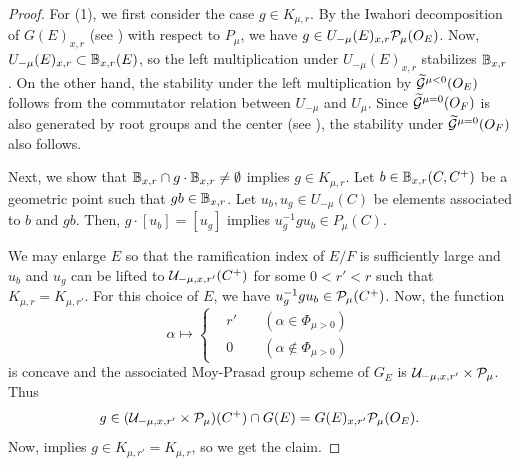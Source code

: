 \documentclass[12pt,reqno]{amsart}
\begin{document}
\begin{proof}
    For (1), we first consider the case $g \in K_{\mu, r}$. By the Iwahori decomposition of $G(E)_{x, r}$ (see \cite[Proposition 13.2.5 (3)]{KP23}) with respect to $P_\mu$, we have $g \in U_{-\mu}(E)_{x, r} {\mathcal{P}}_\mu(O_E)$. Now, $U_{-\mu}(E)_{x, r} \subset \mathbb{B}_{x, r}(E)$, so the left multiplication under $U_{-\mu}(E)_{x, r}$ stabilizes $\mathbb{B}_{x, r}$. On the other hand, the stability under the left multiplication by ${\widetilde{{\mathcal{G}}}}^{\mu < 0}(O_E)$ follows from the commutator relation between $U_{-\mu}$ and $U_{\mu}$. Since ${\widetilde{{\mathcal{G}}}}^{\mu=0}(O_F)$ is also generated by root groups and the center (see \cite[Definition 7.3.3]{KP23}), the stability under ${\widetilde{{\mathcal{G}}}}^{\mu=0}(O_F)$ also follows. 
    
    Next, we show that $\mathbb{B}_{x, r} \cap g \cdot \mathbb{B}_{x, r} \neq \emptyset$ implies $g \in K_{\mu, r}$. Let $b \in \mathbb{B}_{x, r}(C, C^+)$ be a geometric point such that $gb \in \mathbb{B}_{x, r}$. Let $u_b, u_g \in U_{-\mu}(C)$ be elements associated to $b$ and $gb$. Then, $g \cdot [u_b] = [u_g]$ implies 
    $
        u_g^{-1} g u_b \in P_\mu(C). 
    $

    We may enlarge $E$ so that the ramification index of $E / F$ is sufficiently large and $u_b$ and $u_g$ can be lifted to ${\mathcal{U}}_{-\mu, x, r'}(C^+)$ for some $0 < r' < r$ such that $K_{\mu, r} = K_{\mu, r'}$. For this choice of $E$, we have $u_g^{-1} g u_b \in {\mathcal{P}}_\mu(C^+)$. Now, the function 
    \[
        \alpha \mapsto \left\{
            \begin{alignedat}{4}
                & r' & \; & (\alpha \in \Phi_{\mu > 0}) \\
                & 0 & \; & (\alpha \notin \Phi_{\mu > 0})
            \end{alignedat}
        \right.
    \]
    is concave and the associated Moy-Prasad group scheme of $G_E$ is ${\mathcal{U}}_{-\mu, x, r'} \times {\mathcal{P}}_\mu$. Thus
    \[
        g \in ({\mathcal{U}}_{-\mu, x, r'} \times {\mathcal{P}}_\mu)(C^+) \cap G(E) = G(E)_{x, r'}{\mathcal{P}}_\mu(O_E). 
    \]
    Now,  implies $g \in K_{\mu, r'} = K_{\mu, r}$, so we get the claim. 


\end{proof}
\end{document}
